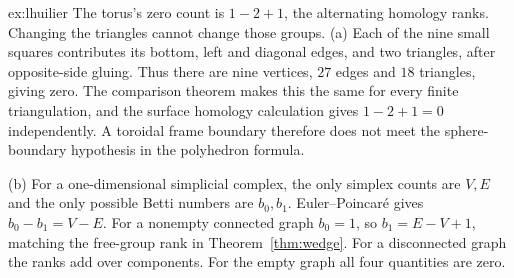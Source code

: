 \begin{solution}{ex:lhuilier}
\idea The torus's zero count is $1-2+1$, the alternating homology ranks. Changing the triangles cannot change those groups.
\writeup (a) Each of the nine small squares contributes its bottom, left and diagonal edges, and two triangles, after opposite-side gluing. Thus there are nine vertices, $27$ edges and $18$ triangles, giving zero. The comparison theorem makes this the same for every finite triangulation, and the surface homology calculation gives $1-2+1=0$ independently. A toroidal frame boundary therefore does not meet the sphere-boundary hypothesis in the polyhedron formula.

(b) For a one-dimensional simplicial complex, the only simplex counts are $V,E$ and the only possible Betti numbers are $b_0,b_1$. Euler--Poincar\'e gives $b_0-b_1=V-E$. For a nonempty connected graph $b_0=1$, so $b_1=E-V+1$, matching the free-group rank in Theorem~\ref{thm:wedge}. For a disconnected graph the ranks add over components. For the empty graph all four quantities are zero.
\end{solution}

